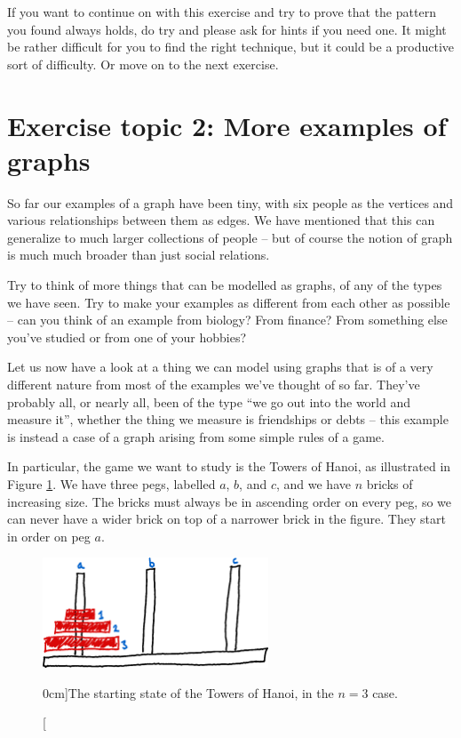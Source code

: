 \documentclass[nobib]{tufte-handout}
\begin{document}
If you want to continue on with this exercise and try to prove that the pattern you found always holds, do try and please ask for hints if you need one. It might be rather difficult for you to find the right technique, but it could be a productive sort of difficulty. Or move on to the next exercise.

\section{Exercise topic 2: More examples of graphs}

So far our examples of a graph have been tiny, with six people as the vertices and various relationships between them as edges. We have mentioned that this can generalize to much larger collections of people -- but of course the notion of graph is much much broader than just social relations.

\begin{xca}
  Try to think of more things that can be modelled as graphs, of any of the types we have seen. Try to make your examples as different from each other as possible -- can you think of an example from biology? From finance? From something else you've studied or from one of your hobbies?
\end{xca}

Let us now have a look at a thing we can model using graphs that is of a very different nature from most of the examples we've thought of so far. They've probably all, or nearly all, been of the type ``we go out into the world and measure it'', whether the thing we measure is friendships or debts -- this example is instead a case of a graph arising from some simple rules of a game.

In particular, the game we want to study is the Towers of Hanoi, as illustrated in Figure \ref{fig:towers_of_hanoi}. We have three pegs, labelled $a$, $b$, and $c$, and we have $n$ bricks of increasing size. The bricks must always be in ascending order on every peg, so we can never have a wider brick on top of a narrower brick in the figure. They start in order on peg $a$.

\begin{figure}
  \centering
  \includegraphics[width=0.6\textwidth]{graphics/L1_exc/towers_of_hanoi.png}
  \caption[][0cm]{The starting state of the Towers of Hanoi, in the $n=3$ case.}
  \label{fig:towers_of_hanoi}
\end{figure}
\end{document}
